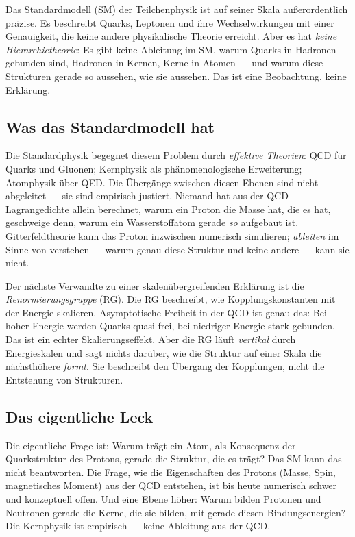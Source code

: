 Das Standardmodell (SM) der Teilchenphysik ist auf seiner Skala
außerordentlich präzise. Es beschreibt Quarks, Leptonen und ihre
Wechselwirkungen mit einer Genauigkeit, die keine andere physikalische
Theorie erreicht. Aber es hat \emph{keine Hierarchietheorie}: Es gibt
keine Ableitung im SM, warum Quarks in Hadronen gebunden sind, Hadronen
in Kernen, Kerne in Atomen --- und warum diese Strukturen gerade so
aussehen, wie sie aussehen. Das ist eine Beobachtung, keine Erklärung.

\subsection*{Was das Standardmodell hat}

Die Standardphysik begegnet diesem Problem durch \emph{effektive
Theorien}: QCD für Quarks und Gluonen; Kernphysik als
phänomenologische Erweiterung; Atomphysik über QED. Die Übergänge
zwischen diesen Ebenen sind nicht abgeleitet --- sie sind empirisch
justiert. Niemand hat aus der QCD-Lagrangedichte allein berechnet,
warum ein Proton die Masse hat, die es hat, geschweige denn, warum ein
Wasserstoffatom gerade \emph{so} aufgebaut ist. Gitterfeldtheorie kann
das Proton inzwischen numerisch simulieren; \emph{ableiten} im Sinne
von verstehen --- warum genau diese Struktur und keine andere --- kann
sie nicht.

Der nächste Verwandte zu einer skalenübergreifenden Erklärung ist die
\emph{Renormierungsgruppe} (RG). Die RG beschreibt, wie
Kopplungskonstanten mit der Energie skalieren. Asymptotische Freiheit
in der QCD ist genau das: Bei hoher Energie werden Quarks quasi-frei,
bei niedriger Energie stark gebunden. Das ist ein echter
Skalierungseffekt. Aber die RG läuft \emph{vertikal} durch
Energieskalen und sagt nichts darüber, wie die Struktur auf einer
Skala die nächsthöhere \emph{formt}. Sie beschreibt den Übergang der
Kopplungen, nicht die Entstehung von Strukturen.

\subsection*{Das eigentliche Leck}

Die eigentliche Frage ist: Warum trägt ein Atom, als Konsequenz der
Quarkstruktur des Protons, gerade die Struktur, die es trägt? Das SM
kann das nicht beantworten. Die Frage, wie die Eigenschaften des
Protons (Masse, Spin, magnetisches Moment) aus der QCD entstehen, ist
bis heute numerisch schwer und konzeptuell offen. Und eine Ebene
höher: Warum bilden Protonen und Neutronen gerade die Kerne, die sie
bilden, mit gerade diesen Bindungsenergien? Die Kernphysik ist
empirisch --- keine Ableitung aus der QCD.

